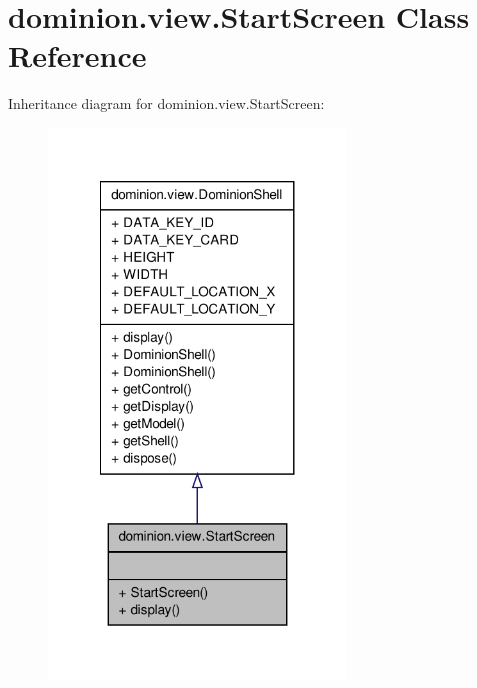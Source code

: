 \hypertarget{classdominion_1_1view_1_1StartScreen}{\section{dominion.\-view.\-Start\-Screen \-Class \-Reference}
\label{classdominion_1_1view_1_1StartScreen}
}


\-Inheritance diagram for dominion.\-view.\-Start\-Screen\-:
\nopagebreak
\begin{figure}[H]
\begin{center}
\leavevmode
\includegraphics[width=224pt]{classdominion_1_1view_1_1StartScreen__inherit__graph}
\end{center}
\end{figure}


